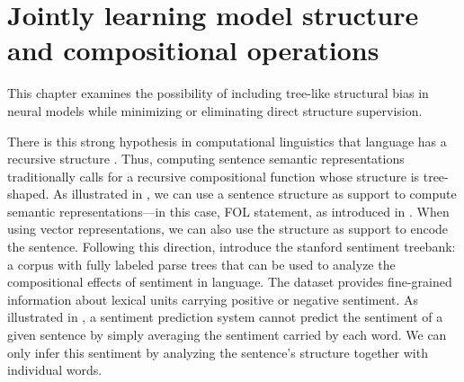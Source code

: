\setchapterpreamble[u]{\margintoc}
\chapter{Jointly learning model structure and compositional operations}




This chapter examines the possibility of including tree-like structural bias in neural models while minimizing or eliminating direct structure supervision. 

There is this strong hypothesis in computational linguistics that language has a recursive structure \parencite{chomsky_56}. Thus, computing sentence semantic representations traditionally calls for a recursive compositional function whose structure is tree-shaped. As illustrated in , we can use a sentence structure as support to compute semantic representations—in this case, FOL statement, as introduced in . When using vector representations, we can also use the structure as support to encode the sentence. Following this direction, \textcite{socher_13} introduce the stanford sentiment treebank: a corpus with fully labeled parse trees that can be used to analyze the compositional effects of sentiment in language. The dataset provides fine-grained information about lexical units carrying positive or negative sentiment. As illustrated in , a sentiment prediction system cannot predict the sentiment of a given sentence by simply averaging the sentiment carried by each word. We can only infer this sentiment by analyzing the sentence's structure together with individual words.

